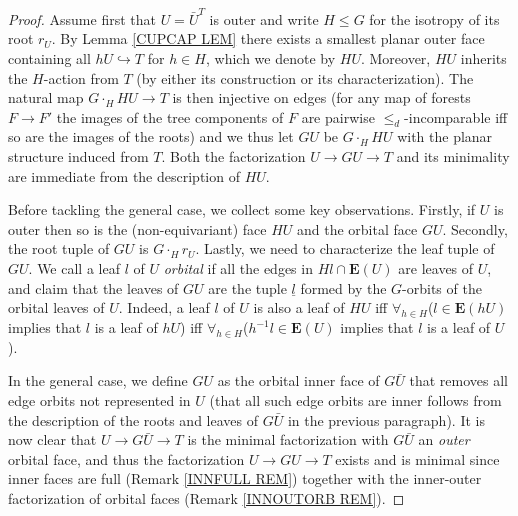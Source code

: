 \documentclass[a4paper,10pt
]{article}%
\begin{document}
\begin{proof}
Assume first that $U=\bar{U}^T$ is outer and write $H\leq G$ for
the isotropy of its root $r_U$.
By Lemma \ref{CUPCAP LEM} there exists a smallest planar outer face 
containing all $h U \hookrightarrow T$ for $h \in H$,
which we denote by $HU$.
Moreover, $HU$ inherits the $H$-action from $T$ 
(by either its construction or its characterization).
The natural map
$G \cdot_H HU \to T$
is then injective on edges
(for any map of forests $F \to F'$
the images of the tree components of $F$ are pairwise $\leq_d$-incomparable iff so are the images of the roots)
and we thus let $GU$ be $G \cdot_H HU$
with the planar structure induced from $T$.
Both the factorization $U \to GU \to T$ and its minimality are immediate from the description of $HU$.

	Before tackling the general case, we collect some key observations.
	Firstly, if $U$ is outer then so is the (non-equivariant) face $HU$ and the orbital face $GU$.
	Secondly, the root tuple of 
	$GU$ is $G\cdot_H r_U$.
	Lastly, we need to characterize the leaf tuple of $GU$. We call a leaf $l$ of $U$ \textit{orbital} if 
all the edges in $Hl \cap \boldsymbol{E}(U)$ are leaves of $U$, 
	and claim that the leaves of $GU$ are the tuple $\underline{l}$ formed by the $G$-orbits of the orbital leaves of $U$. 
	Indeed, a leaf $l$ of $U$ is also a leaf of $HU$ iff 
	$\forall_{h \in H}$($l \in \boldsymbol{E}(hU)$ implies that $l$ is a leaf of $hU$) iff
	$\forall_{h \in H}$($h^{-1} l \in \boldsymbol{E}(U)$ implies that $l$ is a leaf of $U$).
	
	In the general case, we define $GU$ as the orbital inner face of $G \bar{U}$ that removes all edge orbits not represented in $U$ 	(that all such edge orbits are inner follows from the description of the roots and leaves of $G\bar{U}$ in the previous paragraph). 
	It is now clear that $U \to G\bar{U} \to T$ is the minimal factorization with $G\bar{U}$ an \textit{outer} orbital face,
	and thus the factorization
	$U \to GU \to T$ exists and is minimal
	since inner faces are full (Remark \ref{INNFULL REM})
	together with the inner-outer factorization of
	orbital faces (Remark \ref{INNOUTORB REM}).
\end{proof}
\end{document}
